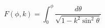 \documentclass[12pt]{article}
\begin{document}
\begin{displaymath}
F(\phi, k) = \int_0^\phi \frac{d\theta}{\sqrt{1-k^2\sin^2\theta}}
\end{displaymath}
\end{document}
